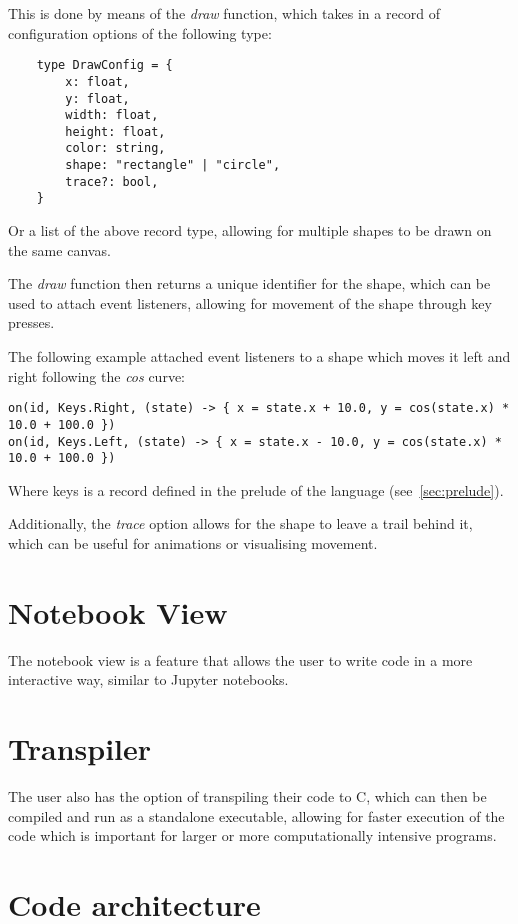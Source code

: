 This is done by means of the \textit{draw} function, which takes in a record of configuration options of the following
type:

\begin{verbatim}
    type DrawConfig = {
        x: float,
        y: float,
        width: float,
        height: float,
        color: string,
        shape: "rectangle" | "circle",
        trace?: bool, 
    }
\end{verbatim}

Or a list of the above record type, allowing for multiple shapes to be drawn on the same canvas.

The \textit{draw} function then returns a unique identifier for the shape, which can be used to attach event 
listeners, allowing for movement of the shape through key presses.

The following example attached event listeners to a shape which moves it left and right following the \textit{cos} curve:

\begin{verbatim}
on(id, Keys.Right, (state) -> { x = state.x + 10.0, y = cos(state.x) * 10.0 + 100.0 })
on(id, Keys.Left, (state) -> { x = state.x - 10.0, y = cos(state.x) * 10.0 + 100.0 })
\end{verbatim}

Where keys is a record defined in the prelude of the language (see~\autoref{sec:prelude}).

Additionally, the \textit{trace} option allows for the shape to leave a trail behind it, which can be useful for
animations or visualising movement.


\section{Notebook View}\label{sec:notebook-view}

The notebook view is a feature that allows the user to write code in a more interactive way, similar to Jupyter
notebooks\citep{Jupyter}.

\section{Transpiler}\label{sec:transpiler}

The user also has the option of transpiling their code to C, which can then be compiled and run as a standalone
executable, allowing for faster execution of the code which is important for larger or more computationally
intensive programs.

\section{Code architecture}\label{sec:code-architecture}